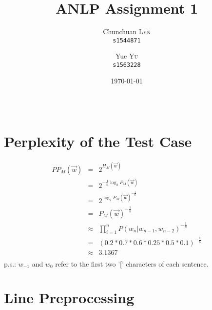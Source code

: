 \documentclass{article}
\title{ANLP Assignment 1} %
\author{
	Chunchuan \textsc{Lyn}\\
	\texttt{s1544871}
	\and
	Yue \textsc{Yu}\\
	\texttt{s1563228}
}
\date{\today} %
\begin{document}
\maketitle %

\begin{center}
\begin{tabular}{l r}
\end{tabular}
\end{center}


\section{Perplexity of the Test Case}
	
	\begin{eqnarray*}
	PP_M(\vec{w}) &=& 2^{H_M(\vec{w})}  \\
	&=& 2^{-\frac{1}{n} \log_2 P_M(\vec{w}) }  \\
	&=& 2^{\log_2 P_M(\vec{w})^{-\frac{1}{n}}} \\
	&=& P_M(\vec{w})^{-\frac{1}{n}} \\
	&\approx& {\prod_{i=1}^{n} P(w_n|w_{n-1},w_{n-2})}^{-\frac{1}{n}} \\
	&=& (0.2*0.7*0.6*0.25*0.5*0.1)^{-\frac{1}{6}} \\
	&\approx& 3.1367 \nonumber \\
	\end{eqnarray*}
	p.s.: $w_{-1}$ and $w_0$ refer to the first two {'['} characters of each sentence.

\section{Line Preprocessing}
\end{document}
